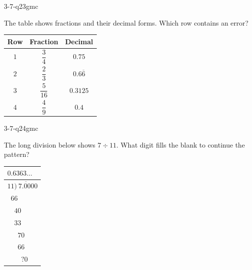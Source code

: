 \begin{practiceQuestion}{3-7-q23}{gmc}
\begin{questionText}
The table shows fractions and their decimal forms. Which row contains an error?

\begin{center}
\begin{tabular}{|c|c|c|}
\hline
\textbf{Row} & \textbf{Fraction} & \textbf{Decimal} \\
\hline
$1$ & $\dfrac{3}{4}$ & $0.75$ \\ \hline
$2$ & $\dfrac{2}{3}$ & $0.6\overline{6}$ \\ \hline
$3$ & $\dfrac{5}{16}$ & $0.3125$ \\ \hline
$4$ & $\dfrac{4}{9}$ & $0.4$ \\ \hline
\end{tabular}
\end{center}
\end{questionText}
\end{practiceQuestion}

\begin{practiceQuestion}{3-7-q24}{gmc}
\begin{questionText}
The long division below shows $7 \div 11$. What digit fills the blank to continue the pattern?

\begin{center}
\begin{tabular}{l}
$0.6363\ldots$ \\
\hline
$11 \overline{)\ 7.0000}$ \\
$\phantom{1}66$ \\
\hline
$\phantom{11}40$ \\
$\phantom{11}33$ \\
\hline
$\phantom{111}70$ \\
$\phantom{111}66$ \\
\hline
$\phantom{1111}\boxed{?}0$ \\
\end{tabular}
\end{center}
\end{questionText}
\end{practiceQuestion}

